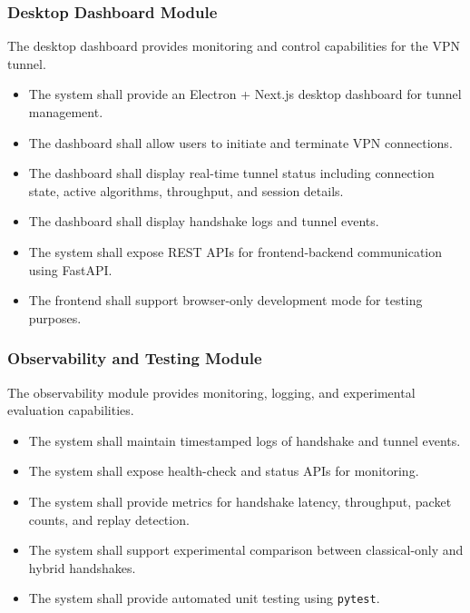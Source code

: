 \subsubsection{Desktop Dashboard Module}

The desktop dashboard provides monitoring and control capabilities for the VPN tunnel.

\begin{itemize}

    \item The system shall provide an Electron + Next.js desktop dashboard for tunnel management.

    \item The dashboard shall allow users to initiate and terminate VPN connections.

    \item The dashboard shall display real-time tunnel status including connection state, active algorithms, throughput, and session details.

    \item The dashboard shall display handshake logs and tunnel events.

    \item The system shall expose REST APIs for frontend-backend communication using FastAPI.

    \item The frontend shall support browser-only development mode for testing purposes.

\end{itemize}

\subsubsection{Observability and Testing Module}

The observability module provides monitoring, logging, and experimental evaluation capabilities.

\begin{itemize}

    \item The system shall maintain timestamped logs of handshake and tunnel events.

    \item The system shall expose health-check and status APIs for monitoring.

    \item The system shall provide metrics for handshake latency, throughput, packet counts, and replay detection.

    \item The system shall support experimental comparison between classical-only and hybrid handshakes.

    \item The system shall provide automated unit testing using \texttt{pytest}.

\end{itemize}

